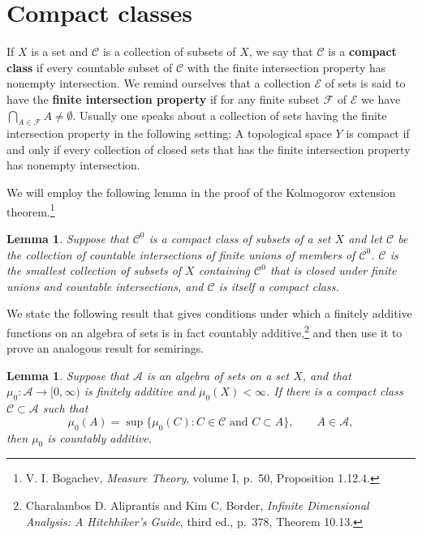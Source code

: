 \documentclass{article}
\newtheorem{lemma}[theorem]{Lemma}
\theoremstyle{definition}
\begin{document}
\section{Compact classes}
If $X$ is a set and $\mathscr{C}$ is a collection of subsets of $X$, we say that $\mathscr{C}$ is a \textbf{compact class}
if every countable subset of $\mathscr{C}$ with the finite intersection property has nonempty intersection. We remind ourselves
that a collection $\mathscr{E}$ of sets is said to have the \textbf{finite intersection property} if for any finite subset $\mathscr{F}$ of $\mathscr{E}$ we have
$\bigcap_{A \in \mathscr{F}} A \neq \emptyset$. Usually one speaks about a collection of sets having the finite intersection property in the following setting:
A topological space $Y$ is compact if and only if every collection of closed sets that has the finite intersection property
has nonempty intersection.

We will employ the following lemma in the proof of the Kolmogorov extension theorem.\footnote{V. I. Bogachev,
{\em Measure Theory}, volume I, p.~50,
Proposition 1.12.4.} 

\begin{lemma}
Suppose that $\mathscr{C}^0$ is a compact class of subsets of a set $X$ and let
$\mathscr{C}$ be the collection of countable intersections of finite unions of members of $\mathscr{C}^0$. $\mathscr{C}$ is the smallest
 collection of subsets of $X$ containing $\mathscr{C}^0$ that is closed
under finite unions and countable intersections, and $\mathscr{C}$ is itself  a compact class.
\label{countablegen}
\end{lemma}


We state the following result that gives conditions under which a finitely additive functions on an algebra of sets is in fact countably additive,\footnote{Charalambos D. 
Aliprantis and Kim C. Border, {\em Infinite Dimensional Analysis: A Hitchhiker's Guide}, third ed., p.~378,
Theorem 10.13.} and then use it to prove an analogous result for semirings. 

\begin{lemma}
Suppose that $\mathscr{A}$ is an algebra of sets on a set $X$, and that $\mu_0:\mathscr{A} \to [0,\infty)$ is finitely additive and
$\mu_0(X)<\infty$.
If there is a compact class $\mathscr{C} \subset \mathscr{A}$ such that
\[
\mu_0(A) = \sup\{\mu_0(C): \textrm{$C \in \mathscr{C}$ and $C \subset A$}\}, \qquad A \in \mathscr{A},
\]
then $\mu_0$ is countably additive.
\label{algebraneveu}
\end{lemma}
\end{document}
